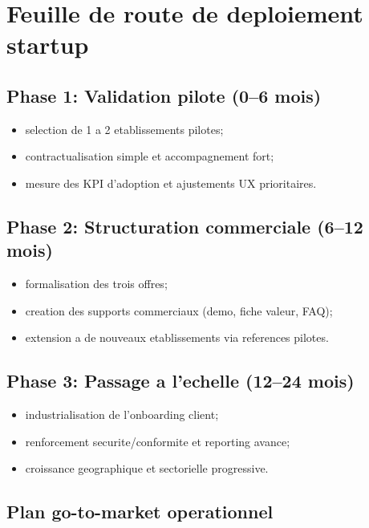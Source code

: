 ﻿\documentclass[12pt,a4paper,oneside]{report}
\begin{document}
\section{Feuille de route de deploiement startup}

\subsection{Phase 1: Validation pilote (0--6 mois)}

\begin{itemize}
  \item selection de 1 a 2 etablissements pilotes;
  \item contractualisation simple et accompagnement fort;
  \item mesure des KPI d'adoption et ajustements UX prioritaires.
\end{itemize}

\subsection{Phase 2: Structuration commerciale (6--12 mois)}

\begin{itemize}
  \item formalisation des trois offres;
  \item creation des supports commerciaux (demo, fiche valeur, FAQ);
  \item extension a de nouveaux etablissements via references pilotes.
\end{itemize}

\subsection{Phase 3: Passage a l'echelle (12--24 mois)}

\begin{itemize}
  \item industrialisation de l'onboarding client;
  \item renforcement securite/conformite et reporting avance;
  \item croissance geographique et sectorielle progressive.
\end{itemize}

\subsection{Plan go-to-market operationnel}
\end{document}
